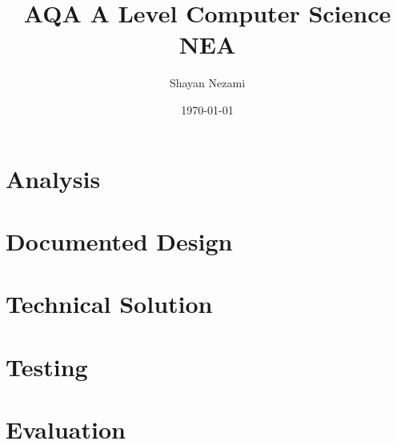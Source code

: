 \documentclass[11pt]{article}
\title{AQA A Level Computer Science NEA}
\author{Shayan Nezami}
\date{\today}
\begin{document}
\maketitle
\tableofcontents
\listoffigures
\lstlistoflistings
\pagebreak

\section{Analysis}

\pagebreak

\section{Documented Design}

\pagebreak

\section{Technical Solution}

\pagebreak

\section{Testing}

\pagebreak

\section{Evaluation}

\pagebreak

\printbibliography
\end{document}
